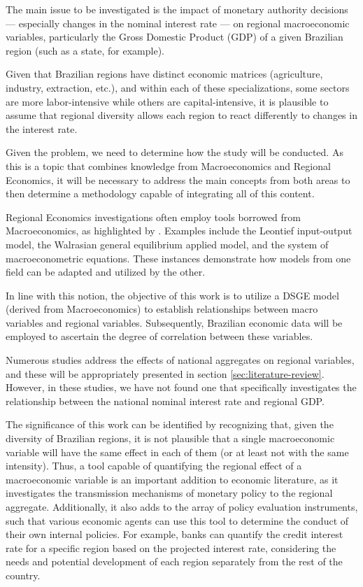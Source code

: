 \documentclass[../thesis.tex]{subfiles}
\begin{document}
	The main issue to be investigated is the impact of monetary authority decisions --- especially changes in the nominal interest rate --- on regional macroeconomic variables, particularly the Gross Domestic Product (GDP) of a given Brazilian region (such as a state, for example).
	
	Given that Brazilian regions have distinct economic matrices (agriculture, industry, extraction, etc.), and within each of these specializations, some sectors are more labor-intensive while others are capital-intensive, it is plausible to assume that regional diversity allows each region to react differently to changes in the interest rate.
	
	Given the problem, we need to determine how the study will be conducted. As this is a topic that combines knowledge from Macroeconomics and Regional Economics, it will be necessary to address the main concepts from both areas to then determine a methodology capable of integrating all of this content.
	
	Regional Economics investigations often employ tools borrowed from Macroeconomics, as highlighted by \textcite{rickman_modern_2010}. Examples include the Leontief input-output model, the Walrasian general equilibrium applied model, and the system of macroeconometric equations. These instances demonstrate how models from one field can be adapted and utilized by the other.
	
	In line with this notion, the objective of this work is to utilize a DSGE model (derived from Macroeconomics) to establish relationships between macro variables and regional variables. Subsequently, Brazilian economic data will be employed to ascertain the degree of correlation between these variables.
	
	Numerous studies address the effects of national aggregates on regional variables, and these will be appropriately presented in section \ref{sec:literature-review}. However, in these studies, we have not found one that specifically investigates the relationship between the national nominal interest rate and regional GDP.
	
	The significance of this work can be identified by recognizing that, given the diversity of Brazilian regions, it is not plausible that a single macroeconomic variable will have the same effect in each of them (or at least not with the same intensity). Thus, a tool capable of quantifying the regional effect of a macroeconomic variable is an important addition to economic literature, as it investigates the transmission mechanisms of monetary policy to the regional aggregate. Additionally, it also adds to the array of policy evaluation instruments, such that various economic agents can use this tool to determine the conduct of their own internal policies. For example, banks can quantify the credit interest rate for a specific region based on the projected interest rate, considering the needs and potential development of each region separately from the rest of the country.
	
\end{document}
